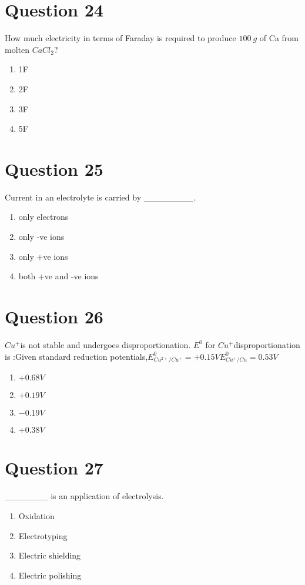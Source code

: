 \documentclass{article}
\begin{document}
\section*{Question 24}
How much electricity in terms of Faraday is required to produce \(100 {~g}\) of Ca from molten \(C a C l_{2} ?\)
\begin{enumerate}[label=(\alph*)]
\item 1F
\item 2F
\item 3F
\item 5F
\end{enumerate}
\newpage
\section*{Question 25}
Current in an electrolyte is carried by ________.
\begin{enumerate}[label=(\alph*)]
\item only electrons
\item only -ve ions
\item only +ve ions
\item both +ve and -ve ions
\end{enumerate}
\newpage
\section*{Question 26}
\(Cu ^{+}\)is not stable and undergoes disproportionation. \(E ^0\) for \(Cu ^{+}\)disproportionation is :Given standard reduction potentials,\(E _{ Cu ^{2+} / Cu ^{+}}^0=+0.15 V \)\newline\(E _{ Cu ^{+} / Cu }^0=0.53 V\)
\begin{enumerate}[label=(\alph*)]
\item \(+0.68 V\)
\item \(+0.19 V\)
\item \(-0.19 V\)
\item \(+0.38 V\)
\end{enumerate}
\newpage
\section*{Question 27}
_______ is an application of electrolysis.
\begin{enumerate}[label=(\alph*)]
\item Oxidation
\item Electrotyping
\item Electric shielding
\item Electric polishing
\end{enumerate}
\newpage
\end{document}
